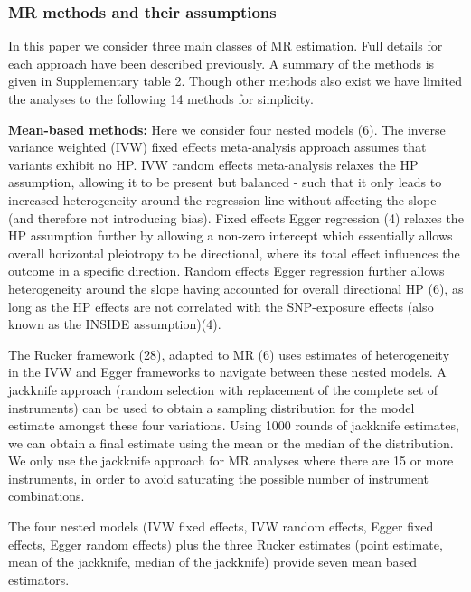 \documentclass[]{article}
\begin{document}
\subsubsection{MR methods and their
assumptions}\label{mr-methods-and-their-assumptions}

In this paper we consider three main classes of MR estimation. Full
details for each approach have been described previously. A summary of
the methods is given in Supplementary table 2. Though other methods also
exist we have limited the analyses to the following 14 methods for
simplicity.

\textbf{Mean-based methods:} Here we consider four nested models (6).
The inverse variance weighted (IVW) fixed effects meta-analysis approach
assumes that variants exhibit no HP. IVW random effects meta-analysis
relaxes the HP assumption, allowing it to be present but balanced - such
that it only leads to increased heterogeneity around the regression line
without affecting the slope (and therefore not introducing bias). Fixed
effects Egger regression (4) relaxes the HP assumption further by
allowing a non-zero intercept which essentially allows overall
horizontal pleiotropy to be directional, where its total effect
influences the outcome in a specific direction. Random effects Egger
regression further allows heterogeneity around the slope having
accounted for overall directional HP (6), as long as the HP effects are
not correlated with the SNP-exposure effects (also known as the INSIDE
assumption)(4).

The Rucker framework (28), adapted to MR (6) uses estimates of
heterogeneity in the IVW and Egger frameworks to navigate between these
nested models. A jackknife approach (random selection with replacement
of the complete set of instruments) can be used to obtain a sampling
distribution for the model estimate amongst these four variations. Using
1000 rounds of jackknife estimates, we can obtain a final estimate using
the mean or the median of the distribution. We only use the jackknife
approach for MR analyses where there are 15 or more instruments, in
order to avoid saturating the possible number of instrument
combinations.

The four nested models (IVW fixed effects, IVW random effects, Egger
fixed effects, Egger random effects) plus the three Rucker estimates
(point estimate, mean of the jackknife, median of the jackknife) provide
seven mean based estimators.
\end{document}
